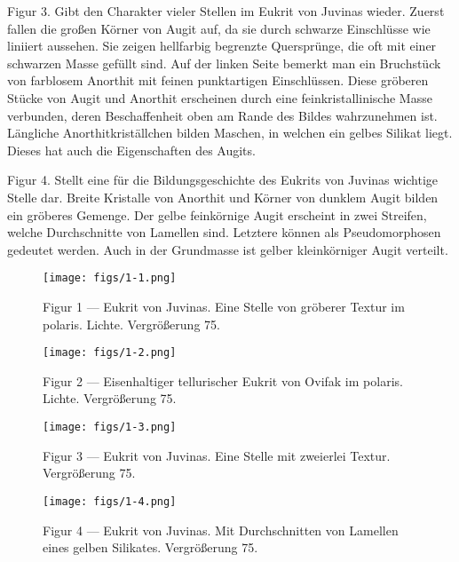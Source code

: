 \documentclass[a4paper, 12pt, oneside]{article}
\begin{document}
Figur 3. Gibt den Charakter vieler Stellen im Eukrit von Juvinas wieder. Zuerst fallen die großen Körner von Augit auf, da sie durch schwarze Einschlüsse wie liniiert aussehen. Sie zeigen hellfarbig begrenzte Quersprünge, die oft mit einer schwarzen Masse gefüllt sind. Auf der linken Seite bemerkt man ein Bruchstück von farblosem Anorthit mit feinen punktartigen Einschlüssen. Diese gröberen Stücke von Augit und Anorthit erscheinen durch eine feinkristallinische Masse verbunden, deren Beschaffenheit oben am Rande des Bildes wahrzunehmen ist. Längliche Anorthitkriställchen bilden Maschen, in welchen ein gelbes Silikat liegt. Dieses hat auch die Eigenschaften des Augits.

Figur 4. Stellt eine für die Bildungsgeschichte des Eukrits von Juvinas wichtige Stelle dar. Breite Kristalle von Anorthit und Körner von dunklem Augit bilden ein gröberes Gemenge. Der gelbe feinkörnige Augit erscheint in zwei Streifen, welche Durchschnitte von Lamellen sind. Letztere können als Pseudomorphosen gedeutet werden. Auch in der Grundmasse ist gelber kleinkörniger Augit verteilt.
\clearpage

\cfoot{\thepage}
\vspace*{\fill}
\begin{figure}[H]
\centering
\texttt{[image: figs/1-1.png]}
\caption{\small Figur 1 --- Eukrit von Juvinas. Eine Stelle von gröberer Textur im polaris. Lichte. Vergrößerung 75.}
\end{figure}
\vspace*{\fill}
\clearpage

\vspace*{\fill}
\begin{figure}[H]
\centering
\texttt{[image: figs/1-2.png]}
\caption{\small Figur 2 --- Eisenhaltiger tellurischer Eukrit von Ovifak im polaris. Lichte. Vergrößerung 75.}
\end{figure}
\vspace*{\fill}
\clearpage

\vspace*{\fill}
\begin{figure}[H]
\centering
\texttt{[image: figs/1-3.png]}
\caption{\small Figur 3 --- Eukrit von Juvinas. Eine Stelle mit zweierlei Textur. Vergrößerung 75.}
\end{figure}
\vspace*{\fill}
\clearpage

\vspace*{\fill}
\begin{figure}[H]
\centering
\texttt{[image: figs/1-4.png]}
\caption{\small Figur 4 --- Eukrit von Juvinas. Mit Durchschnitten von Lamellen eines gelben Silikates. Vergrößerung 75.}
\end{figure}
\vspace*{\fill}
\clearpage
{}
\end{document}
